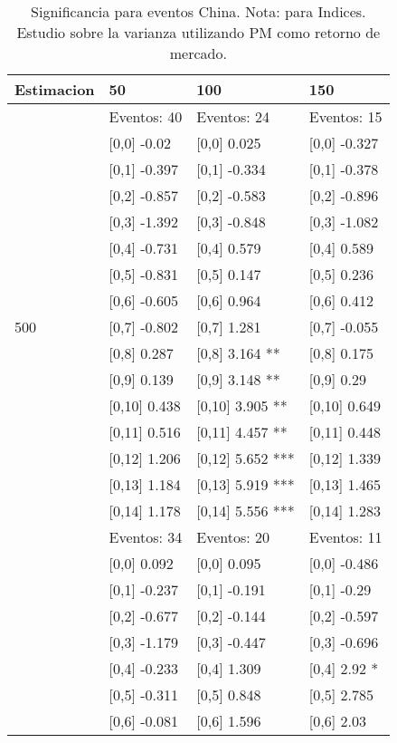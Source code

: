 \begin{table}

\caption{Significancia para eventos China. Nota: para Indices. Estudio sobre la varianza utilizando PM como retorno de mercado.}
\centering
\begin{tabular}[t]{llll}
\toprule
Estimacion & 50 & 100 & 150\\
\midrule
 & Eventos:  40 & Eventos:  24 & Eventos:  15\\
 & {}[0,0] -0.02 & {}[0,0] 0.025 & {}[0,0] -0.327\\
 & {}[0,1] -0.397 & {}[0,1] -0.334 & {}[0,1] -0.378\\
 & {}[0,2] -0.857 & {}[0,2] -0.583 & {}[0,2] -0.896\\
 & {}[0,3] -1.392 & {}[0,3] -0.848 & {}[0,3] -1.082\\
\addlinespace
 & {}[0,4] -0.731 & {}[0,4] 0.579 & {}[0,4] 0.589\\
 & {}[0,5] -0.831 & {}[0,5] 0.147 & {}[0,5] 0.236\\
 & {}[0,6] -0.605 & {}[0,6] 0.964 & {}[0,6] 0.412\\
500 & {}[0,7] -0.802 & {}[0,7] 1.281 & {}[0,7] -0.055\\
 & {}[0,8] 0.287 & {}[0,8] 3.164 ** & {}[0,8] 0.175\\
\addlinespace
 & {}[0,9] 0.139 & {}[0,9] 3.148 ** & {}[0,9] 0.29\\
 & {}[0,10] 0.438 & {}[0,10] 3.905 ** & {}[0,10] 0.649\\
 & {}[0,11] 0.516 & {}[0,11] 4.457 ** & {}[0,11] 0.448\\
 & {}[0,12] 1.206 & {}[0,12] 5.652 *** & {}[0,12] 1.339\\
 & {}[0,13] 1.184 & {}[0,13] 5.919 *** & {}[0,13] 1.465\\
\addlinespace
 & {}[0,14] 1.178 & {}[0,14] 5.556 *** & {}[0,14] 1.283\\
 & Eventos:  34 & Eventos:  20 & Eventos:  11\\
 & {}[0,0] 0.092 & {}[0,0] 0.095 & {}[0,0] -0.486\\
 & {}[0,1] -0.237 & {}[0,1] -0.191 & {}[0,1] -0.29\\
 & {}[0,2] -0.677 & {}[0,2] -0.144 & {}[0,2] -0.597\\
\addlinespace
 & {}[0,3] -1.179 & {}[0,3] -0.447 & {}[0,3] -0.696\\
 & {}[0,4] -0.233 & {}[0,4] 1.309 & {}[0,4] 2.92 *\\
 & {}[0,5] -0.311 & {}[0,5] 0.848 & {}[0,5] 2.785\\
 & {}[0,6] -0.081 & {}[0,6] 1.596 & {}[0,6] 2.03\\

\end{tabular}
\end{table}

